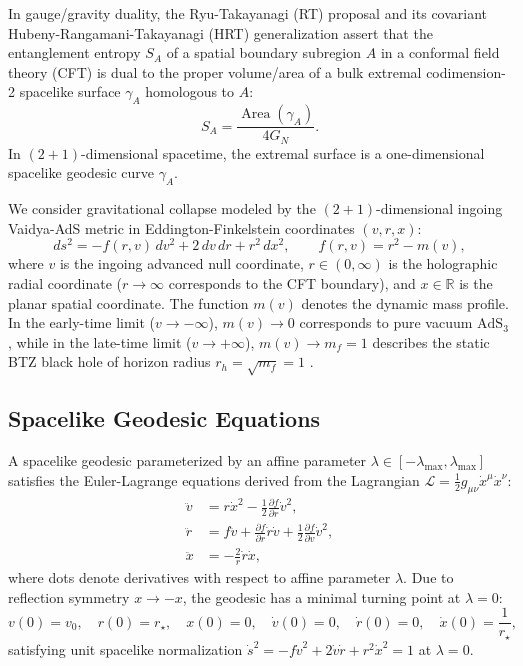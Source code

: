 \documentclass[11pt,a4paper]{article}
\begin{document}
In gauge/gravity duality, the Ryu-Takayanagi (RT) proposal \cite{Ryu:2006bv} and its covariant Hubeny-Rangamani-Takayanagi (HRT) generalization \cite{Hubeny:2007xt} assert that the entanglement entropy $S_A$ of a spatial boundary subregion $A$ in a conformal field theory (CFT) is dual to the proper volume/area of a bulk extremal codimension-2 spacelike surface $\gamma_A$ homologous to $A$:
\begin{equation}
    S_A = \frac{\operatorname{Area}(\gamma_A)}{4 G_N}.
\end{equation}
In $(2+1)$-dimensional spacetime, the extremal surface is a one-dimensional spacelike geodesic curve $\gamma_A$.

We consider gravitational collapse modeled by the $(2+1)$-dimensional ingoing Vaidya-AdS metric in Eddington-Finkelstein coordinates $(v, r, x)$:
\begin{equation}
    ds^2 = -f(r,v)\, dv^2 + 2\, dv\, dr + r^2\, dx^2, \qquad f(r,v) = r^2 - m(v),
    \label{eq:metric}
\end{equation}
where $v$ is the ingoing advanced null coordinate, $r \in (0, \infty)$ is the holographic radial coordinate ($r \to \infty$ corresponds to the CFT boundary), and $x \in \mathbb{R}$ is the planar spatial coordinate. The function $m(v)$ denotes the dynamic mass profile. In the early-time limit ($v \to -\infty$), $m(v) \to 0$ corresponds to pure vacuum $\mathrm{AdS}_3$, while in the late-time limit ($v \to +\infty$), $m(v) \to m_f = 1$ describes the static BTZ black hole of horizon radius $r_h = \sqrt{m_f} = 1$ \cite{AbajoArrastia:2010yt}.

\subsection{Spacelike Geodesic Equations}
A spacelike geodesic parameterized by an affine parameter $\lambda \in [-\lambda_{\mathrm{max}}, \lambda_{\mathrm{max}}]$ satisfies the Euler-Lagrange equations derived from the Lagrangian $\mathcal{L} = \frac{1}{2} g_{\mu\nu} \dot{x}^\mu \dot{x}^\nu$:
\begin{align}
    \ddot{v} &= r \dot{x}^2 - \frac{1}{2} \frac{\partial f}{\partial r} \dot{v}^2, \label{eq:geo_v} \\
    \ddot{r} &= f \ddot{v} + \frac{\partial f}{\partial r} \dot{r} \dot{v} + \frac{1}{2} \frac{\partial f}{\partial v} \dot{v}^2, \label{eq:geo_r} \\
    \ddot{x} &= -\frac{2}{r} \dot{r} \dot{x}, \label{eq:geo_x}
\end{align}
where dots denote derivatives with respect to affine parameter $\lambda$. Due to reflection symmetry $x \to -x$, the geodesic has a minimal turning point at $\lambda = 0$:
\begin{equation}
    v(0) = v_0, \quad r(0) = r_\star, \quad x(0) = 0, \quad \dot{v}(0) = 0, \quad \dot{r}(0) = 0, \quad \dot{x}(0) = \frac{1}{r_\star},
    \label{eq:initial_cond}
\end{equation}
satisfying unit spacelike normalization $\dot{s}^2 = -f \dot{v}^2 + 2 \dot{v} \dot{r} + r^2 \dot{x}^2 = 1$ at $\lambda=0$.
\end{document}
